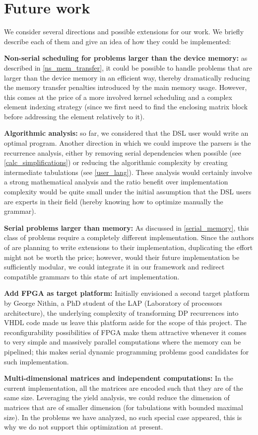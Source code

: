 \section{Future work}
We consider several directions and possible extensions for our work. We briefly describe each of them and give an idea of how they could be implemented:\ol
\item \textbf{Non-serial scheduling for problems larger than the device memory:} as described in \ref{ns_mem_transfer}, it could be possible to handle problems that are larger than the device memory in an efficient way, thereby dramatically reducing the memory transfer penalties introduced by the main memory usage. However, this comes at the price of a more involved kernel scheduling and a complex element indexing strategy (since we first need to find the enclosing matrix block before addressing the element relatively to it).
\item \textbf{Algorithmic analysis:} so far, we considered that the DSL user would write an optimal program. Another direction in which we could improve the parsers is the recurrence analysis, either by removing serial dependencies when possible (see \ref{calc_simplifications}) or reducing the algorithmic complexity by creating intermediate tabulations (see \ref{user_lang}). These analysis would certainly involve a strong mathematical analysis and the ratio benefit over implementation complexity would be quite small under the initial assumption that the DSL users are experts in their field (hereby knowing how to optimize manually the grammar). 
\item \textbf{Serial problems larger than memory:} As discussed in \ref{serial_memory}, this class of problems require a completely different implementation. Since the authors of \cite{swat_mega} are planning to write extensions to their implementation, duplicating the effort might not be worth the price; however, would their future implementation be sufficiently modular, we could integrate it in our framework and redirect compatible grammars to this state of art implementation.
\item \textbf{Add FPGA as target platform:} Initially envisioned a second target platform by George Nithin, a PhD student of the LAP (Laboratory of processors architecture), the underlying complexity of transforming DP recurrences into VHDL code made us leave this platform aside for the scope of this project. The reconfigurability possibilities of FPGA make them attractive whenever it comes to very simple and massively parallel computations where the memory can be pipelined; this makes serial dynamic programming problems good candidates for such implementation.
\item \textbf{Multi-dimensional matrices and independent computations:} In the current implementation, all the matrices are encoded such that they are of the same size. Leveraging the yield analysis, we could reduce the dimension of matrices that are of smaller dimension (for tabulations with bounded maximal size). In the problems we have analyzed, no such special case appeared, this is why we do not support this optimization at present.

